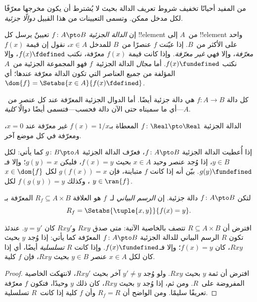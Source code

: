 \documentclass[../../../include/open-logic-section]{subfiles}
\begin{document}


\begin{explain}
من المفيد أحيانًا تخفيف شروط تعريف الدالة بحيث لا يُشترط أن يكون
مخرجها معرّفًا لكل مدخل ممكن. وتسمى التعيينات من هذا القبيل
\emph{دوالًا جزئية}.
\end{explain}

\begin{defn}
إن \emph{الدالة الجزئية} $f \colon A \pto B$ تعيينٌ يرسل كل
!!{element} من~$A$ إلى !!{element} واحد على الأكثر من~$B$.
إذا عيّنت $f$ عنصرًا من~$B$ للمدخل $x \in A$، نقول إن قيمة $f(x)$
\emph{معرّفة}، وإلا فهي \emph{غير معرّفة}. وإذا كانت قيمة $f(x)$ معرّفة،
نكتب $f(x) \fdefined$، وإلا نكتب $f(x) \fundefined$. أما
\emph{مجال} الدالة الجزئية~$f$ فهو المجموعة الجزئية من~$A$ المؤلفة
من جميع العناصر التي تكون الدالة معرّفة عندها؛ أي $\dom{f} = \Setabs{x \in A}{f(x) \fdefined}$.
\end{defn}

\begin{ex}
كل دالة $f\colon A \to B$ هي دالة جزئية أيضًا. أما الدوال
الجزئية المعرّفة عند كل عنصر من~$A$---أي ما سميناه حتى الآن
دالة فحسب---فتسمى أيضًا دوالًا \emph{كلية}.
\end{ex}

\begin{ex}
الدالة الجزئية $f \colon \Real \pto \Real$ المعطاة بـ$f(x) = 1/x$
غير معرّفة عند $x = 0$، ومعرّفة في كل موضع آخر.
\end{ex}

\begin{prob}
إذا أُعطيت الدالة الجزئية $f\colon A \pto B$، فعرّف الدالة الجزئية $g\colon B \pto
A$ كما يأتي: لكل $y \in B$، إذا وُجد عنصر وحيد $x \in A$ بحيث
$f(x) = y$، فليكن $g(y) = x$؛ وإلا فـ$g(y) \fundefined$. بيّن أنه
إذا كانت $f$ متباينة، فإن $g(f(x)) = x$ لكل $x \in \dom{f}$، وكذلك
$f(g(y)) = y$ لكل $y \in \ran{f}$.
\end{prob}

\begin{defn}
لتكن $f\colon A \pto B$ دالة جزئية. إن \emph{الرسم البياني} لـ~$f$
هو العلاقة $R_f \subseteq A \times B$ المعرّفة بـ
\[
R_f = \Setabs{\tuple{x,y}}{f(x) = y}.
\]
\end{defn}

\begin{prop}
افترض أن $R \subseteq A \times B$ تتصف بالخاصية الآتية: متى صدق $Rxy$
و$Rxy'$ كان $y = y'$. عندئذ تكون $R$ الرسم البياني للدالة الجزئية
$f\colon A \pto B$ المعرّفة كما يأتي: إذا وُجد $y$ بحيث
$Rxy$، كان $f(x) = y$؛ وإلا فـ$f(x) \fundefined$. وإذا كانت $R$
\emph{تسلسلية} أيضًا، أي إذا كان لكل $x \in A$ عنصر $y \in B$ بحيث
$Rxy$، فإن $f$ كلية.
\end{prop}

\begin{proof}
افترض أن ثمة $y$ بحيث $Rxy$. ولو وُجد $y'
\neq y$ آخر بحيث $Rxy'$، لانتهكت الخاصية المفروضة على~$R$.
ومن ثم، إذا وُجد $y$ بحيث $Rxy$، كان ذلك $y$
وحيدًا، فتكون $f$ معرّفة تعريفًا سليمًا. ومن الواضح أن $R_f = R$ وأن $f$
كلية إذا كانت~$R$ تسلسلية.
\end{proof}
\end{document}
